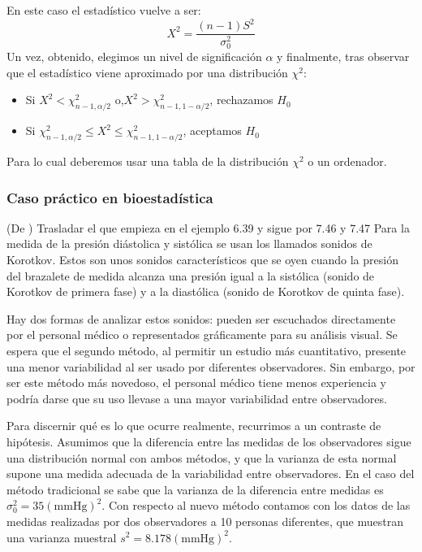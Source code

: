 \documentclass[a4paper,12pt]{article}
\begin{document}
En este caso el estadístico vuelve a ser: 
$$X^2=\frac{(n-1)S^2}{\sigma_0^2}$$
Un vez, obtenido, elegimos un nivel de significación $\alpha$ y finalmente, tras observar que el estadístico viene aproximado por una distribución $\chi^2$:
\begin{itemize}
	\item Si $X^2<\chi^2_{n-1,\alpha/2}$ o,$X^2>\chi^2_{n-1,1-\alpha/2}$, rechazamos $H_0$
	\item Si $\chi^2_{n-1,\alpha/2}\leq X^2\leq\chi^2_{n-1,1-\alpha/2}$, aceptamos $H_0$
\end{itemize}
Para lo cual deberemos usar una tabla de la distribución $\chi^2$ o un ordenador.

\subsubsection*{Caso práctico en bioestadística}
(De \cite{rosner2015fundamentals}) Trasladar el que empieza en el ejemplo 6.39 y sigue por 7.46 y 7.47
    Para la medida de la presión diástolica y sistólica se usan los llamados sonidos de Korotkov. 
    Estos son unos sonidos característicos que se oyen cuando la presión del brazalete de medida alcanza una presión igual a la sistólica (sonido de Korotkov de primera fase) y a la diastólica (sonido de Korotkov de quinta fase).

    Hay dos formas de analizar estos sonidos: pueden ser escuchados directamente por el personal médico o representados gráficamente para su análisis visual.
    Se espera que el segundo método, al permitir un estudio más cuantitativo, presente una menor variabilidad al ser usado por diferentes observadores.
    Sin embargo, por ser este método más novedoso, el personal médico tiene menos experiencia y podría darse que su uso llevase a una mayor variabilidad entre observadores.

    Para discernir qué es lo que ocurre realmente, recurrimos a un contraste de hipótesis. 
    Asumimos que la diferencia entre las medidas de los observadores sigue una distribución normal con ambos métodos, y que la varianza de esta normal supone una medida adecuada de la variabilidad entre observadores.
    En el caso del método tradicional se sabe que la varianza de la diferencia entre medidas es $\sigma_0^2=35 (\textrm{mmHg})^2$.
    Con respecto al nuevo método contamos con los datos de las medidas realizadas por dos observadores a 10 personas diferentes, que muestran una varianza muestral $s^2 = 8.178 (\textrm{mmHg})^2$.
\end{document}

